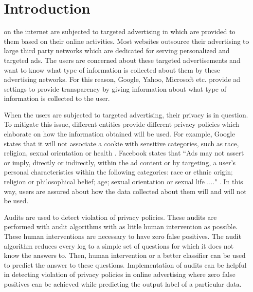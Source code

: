 \documentclass[12pt, journal]{IEEEtran}
\begin{document}
\section{Introduction}
% 
% 
% 
% 
 on the internet are subjected to targeted advertising in which are provided to them based on their online activities. Most websites outsource their advertising to large third party networks which are dedicated for serving personalized and targeted ads. The users are concerned about these targeted advertisements and want to know what type of information is collected about them by these advertising networks. For this reason, Google, Yahoo, Microsoft etc. provide ad settings to provide transparency by giving information about what type of information is collected to the user. 
 
When the users are subjected to targeted advertising, their privacy is in question. To mitigate this issue, different entities provide different privacy policies which elaborate on how the information obtained will be used. For example, Google states that it will not associate a cookie with sensitive categories, such as race, religion, sexual orientation or health \cite{google}. Facebook states that ``Ads may not assert or imply, directly or indirectly, within the ad content or by targeting, a user's personal characteristics within the following categories: race or ethnic origin; religion or philosophical belief; age; sexual orientation or sexual life ...." \cite{fb}. In this way, users are assured about how the data collected about them will and will not be used.
 
 Audits are used to detect violation of privacy policies. These audits are performed with audit algorithms with as little human intervention as possible. These human interventions are necessary to have zero false positives. The audit algorithm reduces every log to a simple set of questions for which it does not know the answers to. Then, human intervention or a better classifier can be used to predict the answer to these questions. Implementation of audits can be helpful in detecting violation of privacy policies in online advertising where zero false positives can be achieved while predicting the output label of a particular data. 
 
\end{document}
